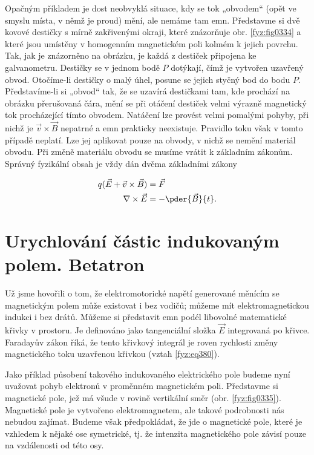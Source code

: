   Opačným příkladem je dost neobvyklá situace, kdy se tok „obvodem“ (opět ve smyslu místa, v němž 
  je proud) mění, ale nemáme tam emn. Představme si dvě kovové destičky s mírně zakřivenými okraji, 
  které znázorňuje obr. \ref{fyz:fig0334} a které jsou umístěny v homogenním magnetickém poli kolmém 
  k jejich povrchu. Tak, jak je znázorněno na obrázku, je každá z destiček připojena ke 
  galvanometru. Destičky se v jednom bodě \(P\) dotýkají, čímž je vytvořen uzavřený obvod. 
  Otočíme-li destičky o malý úhel, posune se jejich styčný bod do bodu \(P\). Představíme-li 
  si „obvod“ tak, že se uzavírá destičkami tam, kde prochází na obrázku přerušovaná čára, mění se 
  při otáčení destiček velmi výrazně magnetický tok procházející tímto obvodem. Natáčení lze 
  provést velmi pomalými pohyby, při nichž je \(\vec{v}\times\vec{B}\) nepatrné a emn prakticky 
  neexistuje. Pravidlo toku však v tomto případě neplatí. Lze jej aplikovat pouze na obvody, v 
  nichž se nemění materiál obvodu. Při změně materiálu obvodu se musíme vrátit k základním zákonům. 
  Správný fyzikální obsah je vždy dán dvěma základními zákony
  
  \begin{align*}
    q(\vec{E} + \vec{v}\times\vec{B}) &=  \vec{F}   \\
                  \nabla\times\vec{E} &= -\pder{\vec{B}}{t}.
  \end{align*}

\section{Urychlování částic indukovaným polem. Betatron}\label{fyz:IIchapXVIIsecIII}
  Už jsme hovořili o tom, že elektromotorické napětí generované měnícím se magnetickým polem může 
  existovat i bez vodičů; můžeme mít elektromagnetickou indukci i bez drátů. Můžeme si představit 
  emn podél libovolné matematické křivky v prostoru. Je definováno jako tangenciální složka 
  \(\vec{E}\) integrovaná po křivce. Faradayův zákon říká, že tento křivkový integrál je roven 
  rychlosti změny magnetického toku uzavřenou křivkou (vztah \ref{fyz:eq380}).
  
  Jako příklad působení takového indukovaného elektrického pole budeme nyní uvažovat pohyb 
  elektronů v proměnném magnetickém poli. Představme si magnetické pole, jež má všude v rovině 
  vertikální směr (obr. \ref{fyz:fig0335}). Magnetické pole je vytvořeno elektromagnetem, ale takové 
  podrobnosti nás nebudou zajímat. Budeme však předpokládat, že jde o magnetické pole, které je 
  vzhledem k nějaké ose symetrické, tj. že intenzita magnetického pole závisí pouze na vzdálenosti 
  od této osy.


